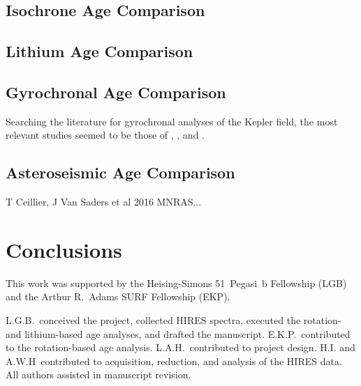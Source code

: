 \documentclass[11pt,twocolumn,tighten]{aastex63}
\begin{document}
\subsection{Isochrone Age Comparison}

\subsection{Lithium Age Comparison}

\subsection{Gyrochronal Age Comparison}
Searching the literature for gyrochronal analyses of the Kepler field,
the most relevant studies seemed to be those of
\citet{Walkowicz_2013}, \citet{Reinhold_2015}, and 
\citet{David_2021}.

\subsection{Asteroseismic Age Comparison}
T Ceillier, J Van Saders et al 2016 MNRAS...


\section{Conclusions}
\label{sec:conclusions}

\acknowledgements
This work was supported by the 
Heising-Simons 51~Pegasi~b Fellowship (LGB)
and the Arthur R.~Adams SURF Fellowship (EKP).

L.G.B.~conceived the project, collected HIRES spectra, executed the
rotation- and lithium-based age analyses, and drafted the manuscript.
E.K.P.~contributed to the rotation-based age analysis.
L.A.H.~contributed to project design.
H.I. and A.W.H~contributed to acquisition, reduction, and analysis of
the HIRES data.
All authors assisted in manuscript revision.









\clearpage
\listofchanges
\end{document}
